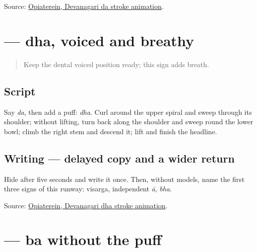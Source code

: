 \begin{tcolorbox}[breakable,colback=teal!4,colframe=teal!35!black,title={Before you move on}]
Source: \href{https://commons.wikimedia.org/wiki/File:Deva-\%E0\%A4\%A6-order.gif}{Opiaterein, Devanagari da stroke animation}.
\end{tcolorbox}
\section[\texorpdfstring{\mr{ध} (dha)}{ध (dha)}]{ — dha, voiced and breathy}

\label{lesson:MR-W03-dha}



\begin{quote}
Keep the dental voiced position ready; this sign adds breath.
\end{quote}

\subsection*{Script}
\begin{quote}
\end{quote}

Say \emph{da}, then add a puff: \emph{dha}. Curl around the upper spiral and sweep through its shoulder; without lifting, turn back along the shoulder and sweep round the lower bowl; climb the right stem and descend it; lift and finish the headline.

\subsection*{Writing — delayed copy and a wider return}

Hide \textbf{} after five seconds and write it once. Then, without models, name the first three signs of this runway: visarga, independent \emph{ā}, \emph{bha}.

\begin{tcolorbox}[breakable,colback=teal!4,colframe=teal!35!black,title={Before you move on}]
Source: \href{https://commons.wikimedia.org/wiki/File:Deva-\%E0\%A4\%A7-order.gif}{Opiaterein, Devanagari dha stroke animation}.
\end{tcolorbox}
\section[\texorpdfstring{\mr{ब} (ba)}{ब (ba)}]{ — ba without the puff}

